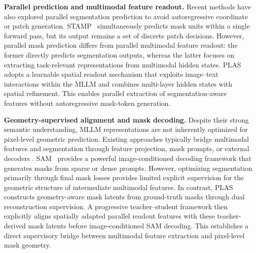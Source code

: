\noindent\textbf{Parallel prediction and multimodal
	feature readout.}
Recent methods have also explored parallel
segmentation prediction to avoid autoregressive
coordinate or patch generation.
STAMP~\cite{Liu2026STAMP} simultaneously predicts
mask units within a single forward pass,
but its output remains a set of discrete patch
decisions.
However, parallel mask prediction differs
from parallel multimodal feature readout:
the former directly predicts segmentation
outputs, whereas the latter focuses on
extracting task-relevant representations
from multimodal hidden states.
PLAS adopts a learnable spatial readout
mechanism that exploits image--text interactions
within the MLLM and combines multi-layer
hidden states with spatial refinement.
This enables parallel extraction of
segmentation-aware features without
autoregressive mask-token generation.

\noindent\textbf{Geometry-supervised alignment
	and mask decoding.}
Despite their strong semantic understanding,
MLLM representations are not inherently
optimized for pixel-level geometric prediction.
Existing approaches typically bridge multimodal
features and segmentation through feature
projection, mask prompts, or external decoders
\cite{Lai2024LISA,Rasheed2024GLaMM,
Chen2024SAM4MLLM,Zou2023XDecoder}.
SAM~\cite{Kirillov2023SAM} provides a powerful
image-conditioned decoding framework that
generates masks from sparse or dense prompts.
However, optimizing segmentation primarily
through final mask losses provides limited
explicit supervision for the geometric
structure of intermediate multimodal features.
In contrast, PLAS constructs geometry-aware
mask latents from ground-truth masks through
dual reconstruction supervision.
A progressive teacher--student framework
then explicitly aligns spatially adapted
parallel readout features with these
teacher-derived mask latents before
image-conditioned SAM decoding.
This establishes a direct supervisory bridge
between multimodal feature extraction
and pixel-level mask geometry.




